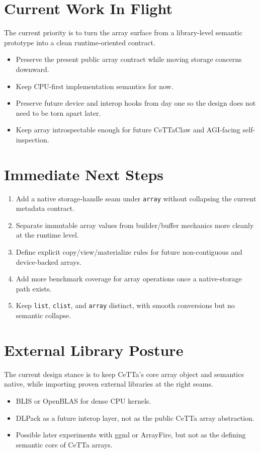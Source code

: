 \documentclass[11pt]{article}
\begin{document}
\section{Current Work In Flight}
The current priority is to turn the array surface from a library-level semantic prototype into a clean runtime-oriented contract.
\begin{itemize}
  \item Preserve the present public array contract while moving storage concerns downward.
  \item Keep CPU-first implementation semantics for now.
  \item Preserve future device and interop hooks from day one so the design does not need to be torn apart later.
  \item Keep array introspectable enough for future CeTTaClaw and AGI-facing self-inspection.
\end{itemize}

\section{Immediate Next Steps}
\begin{enumerate}
  \item Add a native storage-handle seam under \texttt{array} without collapsing the current metadata contract.
  \item Separate immutable array values from builder/buffer mechanics more cleanly at the runtime level.
  \item Define explicit copy/view/materialize rules for future non-contiguous and device-backed arrays.
  \item Add more benchmark coverage for array operations once a native-storage path exists.
  \item Keep \texttt{list}, \texttt{clist}, and \texttt{array} distinct, with smooth conversions but no semantic collapse.
\end{enumerate}

\section{External Library Posture}
The current design stance is to keep CeTTa's core array object and semantics native, while importing proven external libraries at the right seams.
\begin{itemize}
  \item BLIS or OpenBLAS for dense CPU kernels.
  \item DLPack as a future interop layer, not as the public CeTTa array abstraction.
  \item Possible later experiments with ggml or ArrayFire, but not as the defining semantic core of CeTTa arrays.
\end{itemize}
\end{document}

